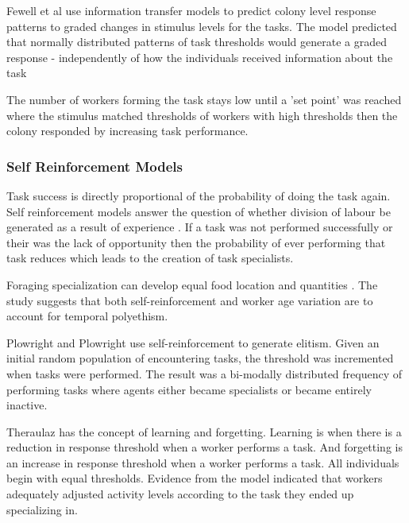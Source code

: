 Fewell et al \cite{fewell1999division} use information transfer models to predict colony level response patterns to graded changes in stimulus levels for the tasks. The model predicted that normally distributed patterns of task thresholds would generate a graded response - independently of how the individuals received information about the task

The number of workers forming the task stays low until a 'set point' was reached where the stimulus matched thresholds of workers with high thresholds then the colony responded by increasing task performance.

\subsubsection{Self Reinforcement Models}
Task success is directly proportional of the probability of doing the task again. Self reinforcement models answer the question of whether division of labour be generated as a result of experience \cite{lerman2005review}. If a task was not performed successfully or their was the lack of opportunity then the probability of ever performing that task reduces which leads to the creation of task specialists. 

Foraging specialization can develop equal food location and quantities \cite{deneubourg1987self}.
The study suggests that both self-reinforcement and worker age variation are to account for temporal polyethism. 

Plowright and Plowright \cite{plowright1988elitism} use self-reinforcement to generate elitism. Given an initial random population of encountering tasks, the threshold was incremented when tasks were performed. The result was a bi-modally distributed frequency of performing tasks where agents either became specialists or became entirely inactive.

Theraulaz \cite{theraulaz1998response} has the concept of learning and forgetting. Learning is when there is a reduction in response threshold when a worker performs a task. And forgetting is an increase in response threshold when a worker performs a task. All individuals begin with equal thresholds. Evidence from the model indicated that workers adequately adjusted activity levels according to the task they ended up specializing in. %

